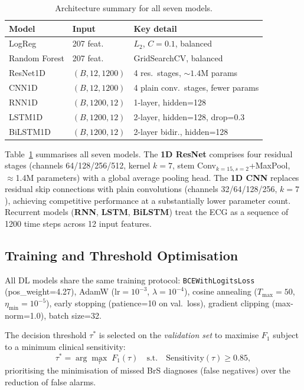\documentclass[journal, 10pt, twoside]{IEEEtran}
\begin{document}
\begin{table}[H]
  \centering
  \caption{Architecture summary for all seven models.}
  \label{tab:arch}
  \renewcommand{\arraystretch}{1.1}
  \begin{tabular}{llp{3.2cm}}
    \toprule
    \textbf{Model}  & \textbf{Input}    & \textbf{Key detail} \\
    \midrule
    LogReg          & 207 feat.         & $L_2$, $C{=}0.1$, balanced \\
    Random Forest   & 207 feat.         & GridSearchCV, balanced \\
    ResNet1D        & $(B,12,1200)$     & 4 res.\ stages, ${\sim}1.4$M params \\
    CNN1D           & $(B,12,1200)$     & 4 plain conv.\ stages, fewer params \\
    RNN1D           & $(B,1200,12)$     & 1-layer, hidden=128 \\
    LSTM1D          & $(B,1200,12)$     & 2-layer, hidden=128, drop=0.3 \\
    BiLSTM1D        & $(B,1200,12)$     & 2-layer bidir., hidden=128 \\
    \bottomrule
  \end{tabular}
\end{table}

Table~\ref{tab:arch} summarises all seven models.
The \textbf{1D ResNet} \cite{he2016deep} comprises four residual
stages (channels 64/128/256/512, kernel $k=7$, stem
Conv$_{k=15,s=2}$+MaxPool, $\approx$1.4M parameters) with a
global average pooling head.
The \textbf{1D CNN} replaces residual skip connections with plain
convolutions (channels 32/64/128/256, $k=7$), achieving competitive
performance at a substantially lower parameter count.
Recurrent models (\textbf{RNN}, \textbf{LSTM}, \textbf{BiLSTM})
treat the ECG as a sequence of 1200 time steps across 12 input features.

\subsection{Training and Threshold Optimisation}

All DL models share the same training protocol:
\texttt{BCEWithLogitsLoss} (pos\_weight=4.27),
AdamW ($\text{lr}=10^{-3}$, $\lambda=10^{-4}$),
cosine annealing ($T_\text{max}=50$, $\eta_\text{min}=10^{-5}$),
early stopping (patience=10 on val.\ loss),
gradient clipping (max-norm=1.0), batch size=32.

The decision threshold $\tau^*$ is selected on the \textit{validation
set} to maximise $F_1$ subject to a minimum clinical sensitivity:
\begin{equation}
  \tau^* = \arg\max_{\tau}\; F_1(\tau)
  \quad \text{s.t.} \quad \text{Sensitivity}(\tau) \geq 0.85,
  \label{eq:thresh}
\end{equation}
prioritising the minimisation of missed BrS diagnoses (false negatives)
over the reduction of false alarms.
\end{document}
